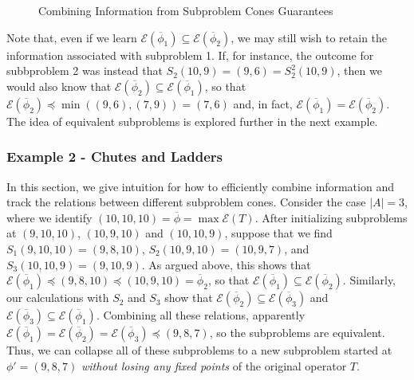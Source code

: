 \documentclass[11pt,reqno]{amsart}
\theoremstyle{definition}
\numberwithin{equation}{section}
\newcommand{\ol}{\overline}
\newcommand{\pre}{\phi}
\newcommand{\sub}{\subseteq}
\newcommand{\fix}{\mathcal{E}}
\newcommand{\peq}{\preceq}
\newcommand{\toppre}{\ol{\pre}}
\begin{document}
\begin{figure} \label{fig:rectangles}
\caption{Combining Information from Subproblem Cones Guarantees}
\end{figure}

Note that, even if we learn $\fix(\toppre_1) \sub \fix(\toppre_2)$, we may still wish to retain the information associated with subproblem 1. 
If, for instance, the outcome for subbproblem 2 was instead that $S_2(10,9) =  (9,6) = S_2^2(10,9)$, then we would also know that $\fix(\toppre_2) \sub \fix(\toppre_1)$, so that $\fix(\toppre_2) \peq \min((9,6),(7,9)) = (7,6)$ and, in fact, $\fix(\toppre_1) = \fix(\toppre_2)$.
The idea of equivalent subproblems is explored further in the next example. 

\subsubsection{Example 2 - Chutes and Ladders}
In this section, we give intuition for how to efficiently combine information and track the relations between different subproblem cones. 
Consider the case $|A| = 3$, where we identify $(10,10,10) = \toppre = \max \fix(T)$. 
After initializing subproblems at $(9,10,10)$, $(10,9,10)$ and $(10,10,9)$, suppose that we find $S_1(9,10,10) = (9,8,10)$, $S_2(10,9,10) = (10,9,7)$, and $S_3(10,10,9) = (9,10,9)$. 
As argued above, this shows that $\fix(\toppre_1) \peq (9,8,10) \peq (10,9,10) = \toppre_2$, so that $\fix(\toppre_1) \sub \fix(\toppre_2)$. 
Similarly, our calculations with $S_2$ and $S_3$ show that $\fix(\toppre_2) \sub \fix(\toppre_3)$ and $\fix(\toppre_3) \sub \fix(\toppre_1)$. 
Combining all these relations, apparently $\fix(\toppre_1) = \fix(\toppre_2) = \fix(\toppre_3) \peq (9,8,7)$, so the subproblems are equivalent.  
Thus, we can collapse all of these subproblems to a new subproblem started at $\pre' = (9,8,7)$ \emph{without losing any fixed points} of the original operator $T$. 
\end{document}
